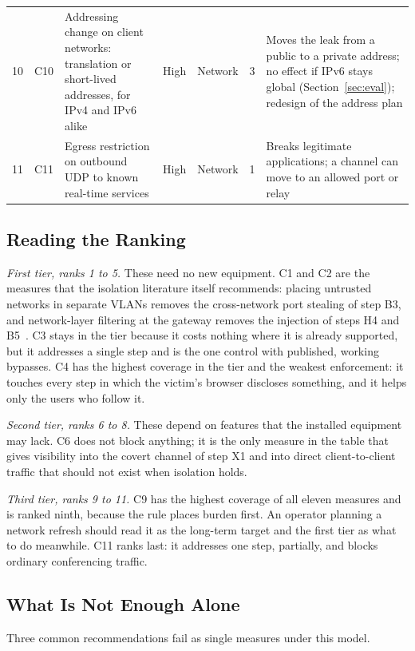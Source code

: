 \documentclass[conference]{IEEEtran}
\begin{document}
\begin{table}[t]
\begin{tabularx}{\textwidth}{@{}L{0.55cm}L{0.5cm}L{4.2cm}L{1.0cm}L{1.5cm}L{1.15cm}Y@{}}
10 & C10 & Addressing change on client networks: translation or short-lived addresses, for IPv4 and IPv6 alike & High & Network & 3 & Moves the leak from a public to a private address; no effect if IPv6 stays global (Section~\ref{sec:eval}); redesign of the address plan \\
11 & C11 & Egress restriction on outbound UDP to known real-time services & High & Network & 1 & Breaks legitimate applications; a channel can move to an allowed port or relay \\
\bottomrule
\end{tabularx}
\end{table}

\subsection{Reading the Ranking}
\textit{First tier, ranks 1 to 5.} These need no new equipment. C1 and C2 are the measures that the isolation literature itself recommends: placing untrusted networks in separate VLANs removes the cross-network port stealing of step B3, and network-layer filtering at the gateway removes the injection of steps H4 and B5~\cite{airsnitch2026}. C3 stays in the tier because it costs nothing where it is already supported, but it addresses a single step and is the one control with published, working bypasses. C4 has the highest coverage in the tier and the weakest enforcement: it touches every step in which the victim's browser discloses something, and it helps only the users who follow it.

\textit{Second tier, ranks 6 to 8.} These depend on features that the installed equipment may lack. C6 does not block anything; it is the only measure in the table that gives visibility into the covert channel of step X1 and into direct client-to-client traffic that should not exist when isolation holds.

\textit{Third tier, ranks 9 to 11.} C9 has the highest coverage of all eleven measures and is ranked ninth, because the rule places burden first. An operator planning a network refresh should read it as the long-term target and the first tier as what to do meanwhile. C11 ranks last: it addresses one step, partially, and blocks ordinary conferencing traffic.

\subsection{What Is Not Enough Alone}
Three common recommendations fail as single measures under this model.
\end{document}
